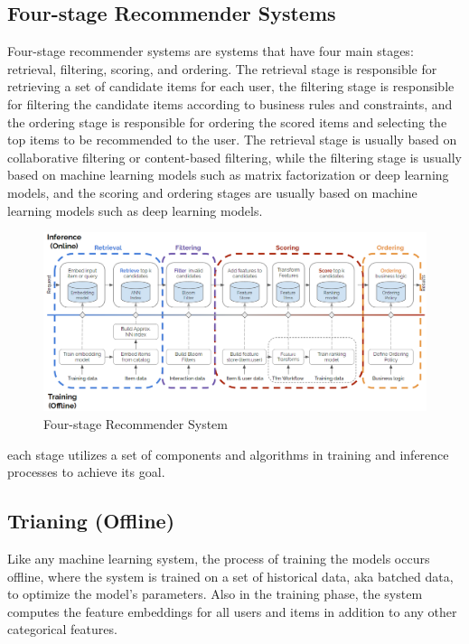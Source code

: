 \subsection{Four-stage Recommender Systems}
Four-stage recommender systems are systems that have four main stages: retrieval, filtering, scoring, and ordering. 
The retrieval stage is responsible for retrieving a set of candidate items for each user, 
the filtering stage is responsible for filtering the candidate items according to business rules and constraints,
and the ordering stage is responsible for ordering the scored items and selecting the top items to be recommended to the user. 
The retrieval stage is usually based on collaborative filtering or content-based filtering, while the filtering stage is 
usually based on machine learning models such as matrix factorization or deep learning models, and the scoring and ordering 
stages are usually based on machine learning models such as deep learning models.\cite{NvidiaRecSysBestPractices}
\begin{figure}[H]
    \centering
    \includegraphics[width=1\textwidth]{assets/Four_stage_rec_sys.png}
    \caption[Four-stage Recommender System]{Four-stage Recommender System\cite{NvidiaRecSysBestPractices}}
\end{figure}
each stage utilizes a set of components and algorithms in training and inference processes to achieve its goal.
\subsection{Trianing (Offline)}
Like any machine learning system, the process of training the models occurs offline,
where the system is trained on a set of historical data, aka batched data, to optimize the model's parameters.
Also in the training phase, the system computes the feature embeddings for all users and items in addition to any other categorical features.


